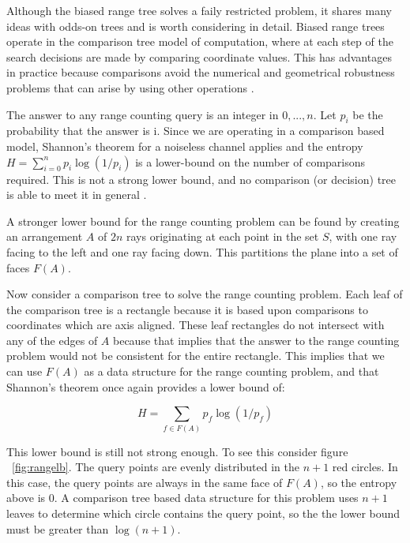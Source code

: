 \documentclass[mcs]{scsthesis}
\begin{document}
Although the biased range tree solves a faily restricted problem, it shares
many ideas with odds-on trees and is worth considering in detail. Biased range
trees operate in the comparison tree model of computation, where at each step
of the search decisions are made by comparing coordinate values. This has
advantages in practice because comparisons avoid the numerical and geometrical
robustness problems that can arise by using other operations \cite{biasedrange}. 

The answer to any range counting query is an integer in \({0, ..., n}\). Let
\(p_i\) be the probability that the answer is i. Since we are operating in a
comparison based model, Shannon's theorem for a noiseless channel applies and
the entropy \(H=\sum_{i=0}^n{p_i\log(1/p_i)}\) is a lower-bound on the number of
comparisons required. This is not a strong lower bound, and no comparison (or
decision) tree is able to meet it in general \cite{biasedrange}.

A stronger lower bound for the range counting problem can be found by creating
an arrangement \(A\) of \(2n\) rays originating at each point in the set \(S\),
with one ray facing to the left and one ray facing down. This partitions the
plane into a set of faces \(F(A)\).

Now consider a comparison tree to solve the range counting problem. Each leaf of
the comparison tree is a rectangle because it is based upon comparisons to
coordinates which are axis aligned.  These leaf rectangles do not intersect with
any of the edges of \(A\) because that implies that the answer to the range
counting problem would not be consistent for the entire rectangle. This implies
that we can use \(F(A)\) as a data structure for the range counting problem,
and that Shannon's theorem once again provides a lower bound of:

$$
H=\sum_{f \in F(A)}{p_f\log(1/p_f)}
$$

This lower bound is still not strong enough. To see this consider figure
~\ref{fig:rangelb}. The query points are evenly distributed in the \(n + 1\)
red circles. In this case, the query points are always in the same face of
\(F(A)\), so the entropy above is 0. A comparison tree based data structure
for this problem uses \(n + 1\) leaves to determine which circle contains
the query point, so the the lower bound must be greater than \(\log(n + 1)\).
\end{document}
